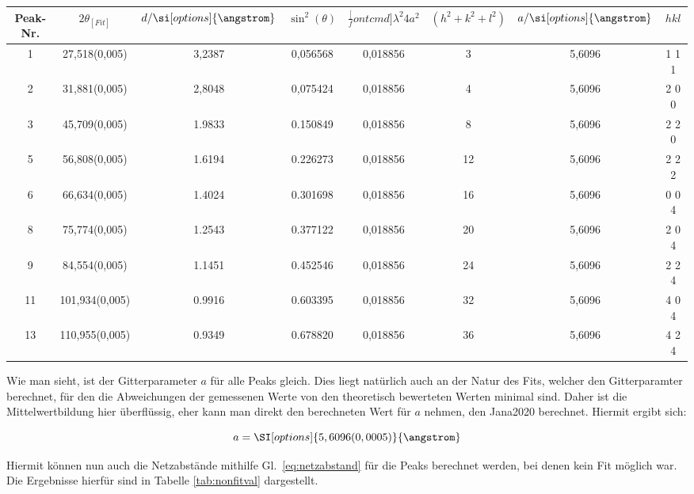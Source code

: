 \begin{table}[h]\label{tab:gitter}
    \centering
     \begin{tabular}{|c|c|c|c|c|c|c|c|} 
     \hline
     Peak-Nr. & $2\theta_{[Fit]}$ & $d/\si[options]{\angstrom}$ & $\sin^2(\theta)$ & $\frac[fontcmd]{\lambda^2}{4a^2}$ & $(h^2+k^2+l^2)$ & $a/\si[options]{\angstrom}$ &  $h k l $ \\ [0.5ex] 
     \hline\hline
     1 & \num[options]{27,518(0,005)} & 3,2387 & 0,056568 & 0,018856 & 3 & 5,6096 & 1 1 1 \\
     2 & \num[options]{31,881(0,005)} & 2,8048 & 0,075424 & 0,018856 & 4 & 5,6096 & 2 0 0 \\
     3 & \num[options]{45,709(0,005)} & 1.9833 & 0.150849 & 0,018856 & 8 & 5,6096 & 2 2 0 \\
     5 & \num[options]{56,808(0,005)} & 1.6194 & 0.226273 & 0,018856 & 12 & 5,6096 & 2 2 2 \\ 
     6 & \num[options]{66,634(0,005)} & 1.4024 & 0.301698 & 0,018856 & 16 &  5,6096 & 0 0 4\\
     8 & \num[options]{75,774(0,005)} & 1.2543 & 0.377122 & 0,018856 & 20 &  5,6096 & 2 0 4\\
     9 & \num[options]{84,554(0,005)} & 1.1451  &  0.452546 & 0,018856 & 24 &  5,6096 & 2 2 4\\
     11 & \num[options]{101,934(0,005)} & 0.9916 & 0.603395 & 0,018856 & 32 &  5,6096 & 4 0 4\\
     13 & \num[options]{110,955(0,005)} & 0.9349 & 0.678820 & 0,018856 & 36 &  5,6096 & 4 2 4\\ [1ex] 
     \hline
     \end{tabular}
\end{table}

Wie man sieht, ist der Gitterparameter $a$ für alle Peaks gleich. Dies liegt natürlich auch an der Natur des Fits, welcher den Gitterparamter berechnet, für den die Abweichungen der gemessenen Werte von den theoretisch bewerteten Werten minimal sind. Daher ist die Mittelwertbildung hier überflüssig, eher kann man direkt den berechneten Wert für $a$ nehmen, den Jana2020 berechnet. Hiermit ergibt sich:

\begin{equation}
    a = \SI[options]{5,6096(0,0005)}{\angstrom}
\end{equation}

Hiermit können nun auch die Netzabstände mithilfe Gl.~\ref{eq:netzabstand} für die Peaks berechnet werden, bei denen kein Fit möglich war. Die Ergebnisse hierfür sind in Tabelle \ref{tab:nonfitval} dargestellt.

